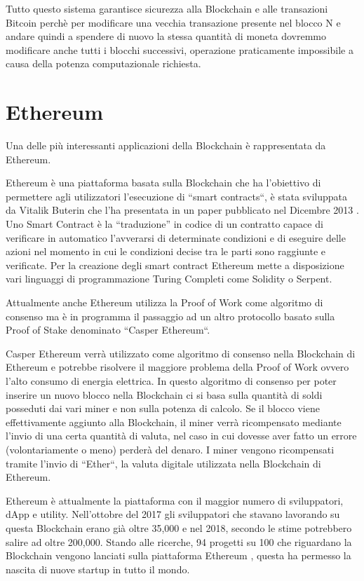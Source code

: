 \documentclass[12pt]{report}
\begin{document}
Tutto questo sistema garantisce sicurezza alla Blockchain e alle transazioni Bitcoin perchè per modificare una vecchia transazione presente nel blocco N e andare quindi a spendere di nuovo la stessa quantità di moneta dovremmo modificare anche tutti i blocchi successivi, operazione praticamente impossibile a causa della potenza computazionale richiesta.


\section{Ethereum}

Una delle più interessanti applicazioni della Blockchain è rappresentata da Ethereum.

Ethereum è una piattaforma basata sulla Blockchain che ha l'obiettivo di permettere agli utilizzatori l'esecuzione di ``smart contracts``, è stata sviluppata da Vitalik Buterin che l'ha presentata in un paper pubblicato nel Dicembre 2013 \cite{ethereumWhitePaper}.
Uno Smart Contract è la “traduzione” in codice di un contratto capace di verificare in automatico l’avverarsi di determinate condizioni e di eseguire delle azioni nel momento in cui le condizioni decise tra le parti sono raggiunte e verificate.
Per la creazione degli smart contract Ethereum mette a disposizione vari linguaggi di programmazione Turing Completi come Solidity o Serpent.

Attualmente anche Ethereum utilizza la Proof of Work come algoritmo di consenso ma è in programma il passaggio ad un altro protocollo basato sulla Proof of Stake denominato ``Casper Ethereum``.

Casper Ethereum verrà utilizzato come algoritmo di consenso nella Blockchain di Ethereum e potrebbe risolvere il maggiore problema della Proof of Work ovvero l'alto consumo di energia elettrica.
In questo algoritmo di consenso per poter inserire un nuovo blocco nella Blockchain ci si basa sulla quantità di soldi posseduti dai vari miner e non sulla potenza di calcolo.
Se il blocco viene effettivamente aggiunto alla Blockchain, il miner verrà ricompensato mediante l'invio di una certa quantità di valuta, nel caso in cui dovesse aver fatto un errore (volontariamente o meno) perderà del denaro.
I miner vengono ricompensati tramite l'invio di ``Ether``, la valuta digitale utilizzata nella Blockchain di Ethereum.

Ethereum è attualmente la piattaforma con il maggior numero di sviluppatori, dApp e utility. 
Nell'ottobre del 2017 gli sviluppatori che stavano lavorando su questa Blockchain erano già oltre 35,000 \cite{sviluppatoriEthereum} e nel 2018, secondo le stime potrebbero salire ad oltre 200,000.
Stando alle ricerche, 94 progetti su 100 che riguardano la Blockchain vengono lanciati sulla piattaforma Ethereum \cite{progettiEthereum}, questa ha permesso la nascita di nuove startup in tutto il mondo.
\end{document}

